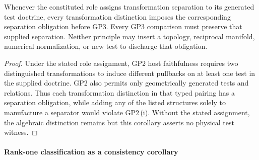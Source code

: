 \documentclass[12pt,a4paper]{article}
\begin{document}
\begin{corollary}
\label{p2:cor:gp2-gp3-reciprocal-obligations}
Whenever the constituted role assigns transformation separation to its
generated test doctrine, every transformation distinction imposes the
corresponding separation obligation before GP3.  Every GP3 comparison must
preserve that supplied separation.  Neither
principle may insert a topology, reciprocal manifold, numerical normalization,
or new test to discharge that obligation.
\end{corollary}

\begin{proof}
Under the stated role assignment, GP2 host faithfulness requires two
distinguished transformations to induce different pullbacks on at least one
test in the supplied doctrine.  GP2 also permits only geometrically generated
tests and relations.  Thus each transformation distinction in that typed
pairing has a separation obligation, while adding any of the listed structures
solely to manufacture a separator would violate GP2\,(i).  Without the stated
assignment, the algebraic distinction remains but this corollary asserts no
physical test witness.
\end{proof}

\paragraph{Rank-one classification as a consistency corollary}
\end{document}

